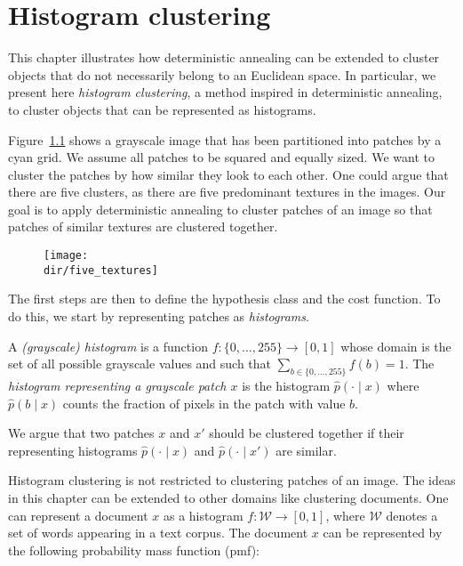 \chapter{Histogram clustering}

This chapter illustrates how deterministic annealing can be extended to cluster objects that do not necessarily belong to an Euclidean space. In
particular, we present here \emph{histogram clustering}, a method inspired in deterministic
annealing, to cluster objects that can be represented as histograms.

Figure~\ref{fig:image_partitioned} shows a grayscale image that has been partitioned into
patches by a cyan grid. We assume all patches to be squared and equally
sized. We want to cluster the patches by how similar they look to each
other. One could argue that there are five clusters, as there are five predominant
textures in the images. Our goal is to apply deterministic annealing
to cluster patches of an image so that patches of similar textures
are clustered together.

\begin{figure}[hbtp]
\centering
\texttt{[image: \\dir/five\_textures]}
\caption{}
\label{fig:image_partitioned}
\end{figure}

The first steps are then to define the hypothesis class and the cost function. To do this, we start by representing patches as \emph{histograms}.

\begin{definition}
A \emph{(grayscale) histogram} is a function $f : \{0, \ldots, 255\} \to [0,1]$ whose domain is the set of all possible grayscale values and such that $\sum_{b \in \{0, \ldots, 255\}} f(b) = 1$. The \emph{histogram representing a grayscale patch $x$} is the histogram $\hat{p}\left(\cdot \mid x\right)$ where $\hat{p}\left(b \mid x\right)$ counts the fraction of pixels in the patch with value $b$.
\end{definition}

We argue that two patches $x$ and $x'$ should be clustered together if their representing histograms $\hat{p}(\cdot \mid x)$ and $\hat{p}\left(\cdot \mid x'\right)$ are similar.

Histogram clustering is not restricted to clustering patches of an image.
The ideas in this chapter can be extended to other domains like clustering
documents. One can represent a document $x$ as a histogram $f : \mathcal{W} \to [0, 1]$,
where $\mathcal{W}$ denotes a set of words appearing in a text corpus. The document $x$ can be represented by the following probability mass function (pmf):

